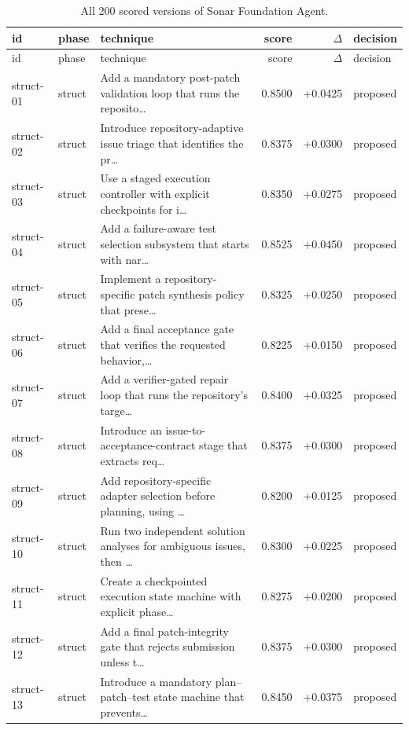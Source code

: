 \begin{center}\scriptsize\begin{longtable}{llp{5.2cm}rrl}
\caption{All 200 scored versions of Sonar Foundation Agent.}\\
\toprule id & phase & technique & score & $\Delta$ & decision \\ \midrule \endfirsthead
\toprule id & phase & technique & score & $\Delta$ & decision \\ \midrule \endhead
struct-01 & struct & Add a mandatory post-patch validation loop that runs the reposito\ldots{} & 0.8500 & +0.0425 & proposed \\
struct-02 & struct & Introduce repository-adaptive issue triage that identifies the pr\ldots{} & 0.8375 & +0.0300 & proposed \\
struct-03 & struct & Use a staged execution controller with explicit checkpoints for i\ldots{} & 0.8350 & +0.0275 & proposed \\
struct-04 & struct & Add a failure-aware test selection subsystem that starts with nar\ldots{} & 0.8525 & +0.0450 & proposed \\
struct-05 & struct & Implement a repository-specific patch synthesis policy that prese\ldots{} & 0.8325 & +0.0250 & proposed \\
struct-06 & struct & Add a final acceptance gate that verifies the requested behavior,\ldots{} & 0.8225 & +0.0150 & proposed \\
struct-07 & struct & Add a verifier-gated repair loop that runs the repository's targe\ldots{} & 0.8400 & +0.0325 & proposed \\
struct-08 & struct & Introduce an issue-to-acceptance-contract stage that extracts req\ldots{} & 0.8375 & +0.0300 & proposed \\
struct-09 & struct & Add repository-specific adapter selection before planning, using \ldots{} & 0.8200 & +0.0125 & proposed \\
struct-10 & struct & Run two independent solution analyses for ambiguous issues, then \ldots{} & 0.8300 & +0.0225 & proposed \\
struct-11 & struct & Create a checkpointed execution state machine with explicit phase\ldots{} & 0.8275 & +0.0200 & proposed \\
struct-12 & struct & Add a final patch-integrity gate that rejects submission unless t\ldots{} & 0.8375 & +0.0300 & proposed \\
struct-13 & struct & Introduce a mandatory plan–patch–test state machine that prevents\ldots{} & 0.8450 & +0.0375 & proposed \\

\end{longtable}
\end{center}
